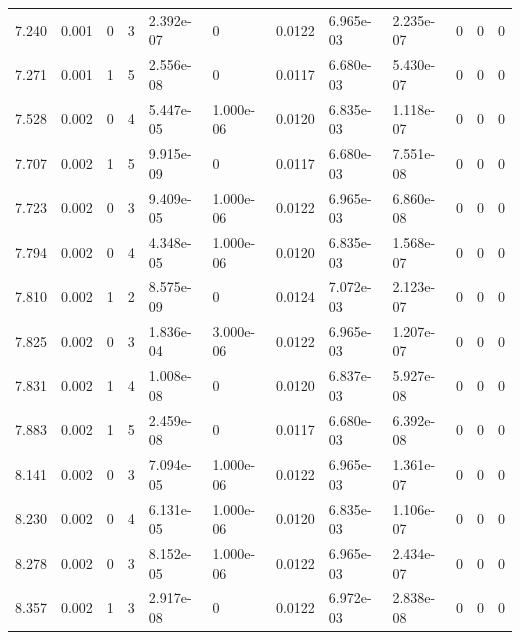 \documentclass[preview]{standalone}
\begin{document}
{{{\begin{tabular}{L{1.2cm}C{1.2cm} C{0.3cm}C{0.5cm} C{1.4cm}C{1.4cm} C{1.4cm}C{1.4cm} C{1.6cm}C{1.6cm} C{1.6cm}C{1.6cm}}
  7.240  &  0.001  & 0     &  3 &  2.392e-07  & 0  &  0.0122&   6.965e-03& 2.235e-07 & 0   &  0 & 0  \\ 
  7.271  &  0.001  & 1     &  5 &  2.556e-08  & 0  &  0.0117&   6.680e-03& 5.430e-07 & 0   &  0 & 0  \\ 
  7.528  &  0.002  & 0     &  4 &  5.447e-05  & 1.000e-06  &  0.0120&   6.835e-03& 1.118e-07 & 0   &  0 & 0  \\ 
  7.707  &  0.002  & 1     &  5 &  9.915e-09  & 0  &  0.0117&   6.680e-03& 7.551e-08 & 0   &  0 & 0  \\ 
  7.723  &  0.002  & 0     &  3 &  9.409e-05  & 1.000e-06  &  0.0122&   6.965e-03& 6.860e-08 & 0   &  0 & 0  \\ 
  7.794  &  0.002  & 0     &  4 &  4.348e-05  & 1.000e-06  &  0.0120&   6.835e-03& 1.568e-07 & 0   &  0 & 0  \\ 
  7.810  &  0.002  & 1     &  2 &  8.575e-09  & 0  &  0.0124&   7.072e-03& 2.123e-07 & 0   &  0 & 0  \\ 
  7.825  &  0.002  & 0     &  3 &  1.836e-04  & 3.000e-06  &  0.0122&   6.965e-03& 1.207e-07 & 0   &  0 & 0  \\ 
  7.831  &  0.002  & 1     &  4 &  1.008e-08  & 0  &  0.0120&   6.837e-03& 5.927e-08 & 0   &  0 & 0  \\ 
  7.883  &  0.002  & 1     &  5 &  2.459e-08  & 0  &  0.0117&   6.680e-03& 6.392e-08 & 0   &  0 & 0  \\ 
  8.141  &  0.002  & 0     &  3 &  7.094e-05  & 1.000e-06  &  0.0122&   6.965e-03& 1.361e-07 & 0   &  0 & 0  \\ 
  8.230  &  0.002  & 0     &  4 &  6.131e-05  & 1.000e-06  &  0.0120&   6.835e-03& 1.106e-07 & 0   &  0 & 0  \\ 
  8.278  &  0.002  & 0     &  3 &  8.152e-05  & 1.000e-06  &  0.0122&   6.965e-03& 2.434e-07 & 0   &  0 & 0  \\ 
  8.357  &  0.002  & 1     &  3 &  2.917e-08  & 0  &  0.0122&   6.972e-03& 2.838e-08 & 0   &  0 & 0  \\ 
\hline 
\end{tabular} 

}}}
\end{document}
